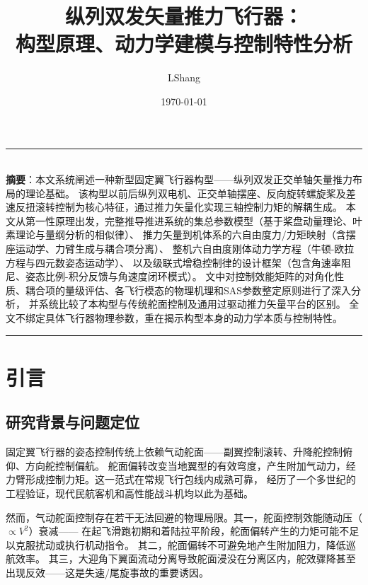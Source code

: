 \documentclass[a4paper,12pt]{ctexart}
\title{\textbf{纵列双发矢量推力飞行器：\\构型原理、动力学建模与控制特性分析}}
\author{LShang}
\date{\today}
\theoremstyle{plain}
\theoremstyle{definition}
\begin{document}
\maketitle

\begin{center}
\rule{0.6\textwidth}{0.5pt}\\[6pt]
{\small
\textbf{摘要}：本文系统阐述一种新型固定翼飞行器构型——纵列双发正交单轴矢量推力布局的理论基础。
该构型以前后纵列双电机、正交单轴摆座、反向旋转螺旋桨及差速反扭滚转控制为核心特征，通过推力矢量化实现三轴控制力矩的解耦生成。
本文从第一性原理出发，完整推导推进系统的集总参数模型（基于桨盘动量理论、叶素理论与量纲分析的相似律）、
推力矢量到机体系的六自由度力/力矩映射（含摆座运动学、力臂生成与耦合项分离）、
整机六自由度刚体动力学方程（牛顿-欧拉方程与四元数姿态运动学）、
以及级联式增稳控制律的设计框架（包含角速率阻尼、姿态比例-积分反馈与角速度闭环模式）。
文中对控制效能矩阵的对角化性质、耦合项的量级评估、各飞行模态的物理机理和SAS参数整定原则进行了深入分析，
并系统比较了本构型与传统舵面控制及通用过驱动推力矢量平台的区别。
全文不绑定具体飞行器物理参数，重在揭示构型本身的动力学本质与控制特性。
}
\end{center}

\rule{\textwidth}{0.5pt}

\tableofcontents

\newpage

\section{引言}
\label{sec:intro}

\subsection{研究背景与问题定位}

固定翼飞行器的姿态控制传统上依赖气动舵面——副翼控制滚转、升降舵控制俯仰、方向舵控制偏航。
舵面偏转改变当地翼型的有效弯度，产生附加气动力，经力臂形成控制力矩。这一范式在常规飞行包线内成熟可靠，
经历了一个多世纪的工程验证，现代民航客机和高性能战斗机均以此为基础\cite{stevens2015aircraft}。

然而，气动舵面控制存在若干无法回避的物理局限。其一，舵面控制效能随动压（$\propto V^2$）衰减——
在起飞滑跑初期和着陆拉平阶段，舵面偏转产生的力矩可能不足以克服扰动或执行机动指令。
其二，舵面偏转不可避免地产生附加阻力，降低巡航效率。
其三，大迎角下翼面流动分离导致舵面浸没在分离区内，舵效骤降甚至出现反效——这是失速/尾旋事故的重要诱因。
\end{document}
